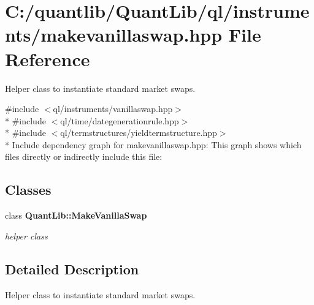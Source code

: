 \section{C\+:/quantlib/\+Quant\+Lib/ql/instruments/makevanillaswap.hpp File Reference}
\label{makevanillaswap_8hpp}


Helper class to instantiate standard market swaps.  


{\ttfamily \#include $<$ql/instruments/vanillaswap.\+hpp$>$}\\*
{\ttfamily \#include $<$ql/time/dategenerationrule.\+hpp$>$}\\*
{\ttfamily \#include $<$ql/termstructures/yieldtermstructure.\+hpp$>$}\\*
Include dependency graph for makevanillaswap.\+hpp\+:
This graph shows which files directly or indirectly include this file\+:
\subsection*{Classes}
\begin{DoxyCompactItemize}
\item 
class {\bf Quant\+Lib\+::\+Make\+Vanilla\+Swap}
\begin{DoxyCompactList}\small\item\em helper class \end{DoxyCompactList}\end{DoxyCompactItemize}


\subsection{Detailed Description}
Helper class to instantiate standard market swaps. 

